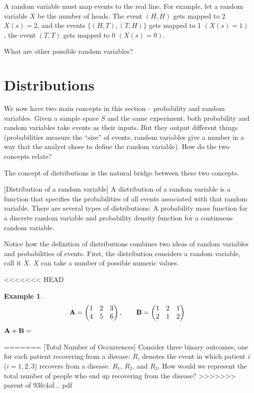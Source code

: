 \documentclass[]{book}
\theoremstyle{definition}
\theoremstyle{definition}
\newtheorem{example}{Example}[chapter]
\theoremstyle{definition}
\theoremstyle{remark}
\begin{document}
A random variable must map events to the real line. For example, let a random variable \(X\) be the number of heads. The event \((H, H)\) gets mapped to 2 \(X(s) = 2\), and the events \(\{(H, T), (T, H)\}\) gets mapped to 1 \((X(s) = 1)\), the event \((T, T)\) gets mapped to 0 \((X(s) = 0)\).

What are other possible random variables?

\hypertarget{distributions}{%
\section{Distributions}\label{distributions}}

We now have two main concepts in this section -- probability and random variables. Given a sample space \(S\) and the same experiment, both probability and random variables take events as their inputs. But they output different things (probabilities measure the ``size'' of events, random variables give a number in a way that the analyst chose to define the random variable). How do the two concepts relate?

The concept of distributions is the natural bridge between these two concepts.

[Distribution of a random variable]
\protect\hypertarget{def:unnamed-chunk-72}{}{\label{def:unnamed-chunk-72} {} }A distribution of a random variable is a function that specifies the probabilities of all events associated with that random variable. There are several types of distributions: A probability mass function for a discrete random variable and probability density function for a continuous random variable.

Notice how the definition of distributions combines two ideas of random variables and probabilities of events. First, the distribution considers a random variable, call it \(X\). \(X\) can take a number of possible numeric values.

<<<<<<< HEAD
\begin{example}
\protect\hypertarget{exm:matrixaddition}{}{\label{exm:matrixaddition} }\[{\bf A}=\begin{pmatrix} 1 & 2 & 3 \\ 4 & 5 & 6 \end{pmatrix}, \qquad
            {\bf B}=\begin{pmatrix} 1 & 2 & 1 \\ 2 & 1 & 2 \end{pmatrix}\]
\({\bf A+B}=\)
\end{example}
=======
[Total Number of Occurrences]
\protect\hypertarget{exm:unnamed-chunk-73}{}{\label{exm:unnamed-chunk-73} {} }
Consider three binary outcomes, one for each patient recovering from a disease: \(R_i\) denotes the event in which patient \(i\) (\(i = 1, 2, 3\)) recovers from a disease. \(R_1\), \(R_2\), and \(R_3\). How would we represent the total number of people who end up recovering from the disease?
>>>>>>> parent of 93fc4af... pdf
\end{document}
